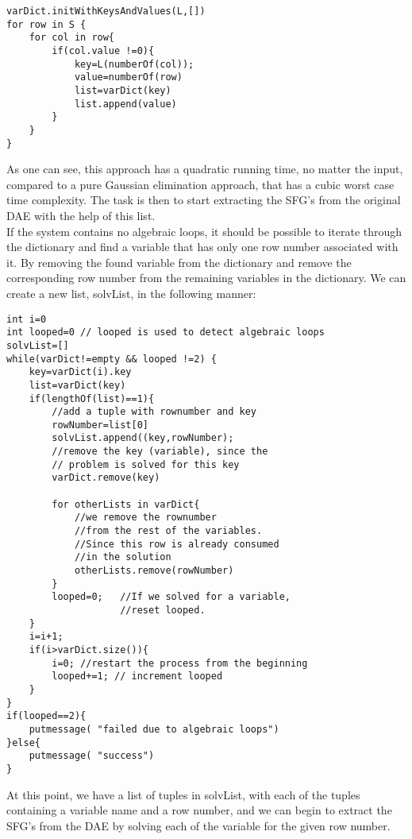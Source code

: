 \begin{lstlisting}
varDict.initWithKeysAndValues(L,[])
for row in S {
	for col in row{
		if(col.value !=0){
			key=L(numberOf(col));
			value=numberOf(row)
			list=varDict(key)
			list.append(value)		
		}
	}			
}
\end{lstlisting}
As one can see, this approach has a quadratic running time, no matter the input, compared to a pure Gaussian elimination approach, that has a cubic worst case time complexity. The task is then to start extracting the SFG's from the original DAE with the help of this list.\\\newline If the system contains no algebraic loops, it should be possible to iterate through the dictionary and find a variable that has only one row number associated with it. By removing the found variable from the dictionary and remove the corresponding row number from the remaining variables in the dictionary. We can create a  new list, solvList, in the following manner:
\begin{lstlisting}
int i=0
int looped=0 // looped is used to detect algebraic loops
solvList=[]
while(varDict!=empty && looped !=2) {
	key=varDict(i).key
	list=varDict(key)
	if(lengthOf(list)==1){
		//add a tuple with rownumber and key
		rowNumber=list[0]
		solvList.append((key,rowNumber);
		//remove the key (variable), since the
		// problem is solved for this key
		varDict.remove(key)
		
		for otherLists in varDict{
			//we remove the rownumber 
			//from the rest of the variables.
			//Since this row is already consumed
			//in the solution
			otherLists.remove(rowNumber)
		}
		looped=0; 	//If we solved for a variable, 
					//reset looped.
	}
	i=i+1;
	if(i>varDict.size()){
		i=0; //restart the process from the beginning
		looped+=1; // increment looped 	
	}			
}
if(looped==2){
	putmessage( "failed due to algebraic loops")
}else{
	putmessage( "success")
}

\end{lstlisting}
At this point, we have a list of tuples in solvList, with each of the tuples containing a variable name and a row number, and we can begin to extract the SFG's from the DAE by solving each of the variable for the given row number.
